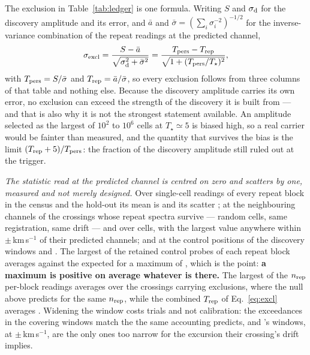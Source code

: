 The exclusion in Table~\ref{tab:ledger} is one formula. Writing $S$ and
$\sigma_{\rm d}$ for the discovery amplitude and its error, and $\bar{a}$ and
$\bar{\sigma}=(\sum_i\sigma_i^{-2})^{-1/2}$ for the inverse-variance
combination of the repeat readings at the predicted channel,
\begin{equation}
\sigma_{\rm excl}=\frac{S-\bar{a}}
{\sqrt{\sigma_{\rm d}^{2}+\bar{\sigma}^{2}}}
=\frac{T_{\rm pers}-T_{\rm rep}}{\sqrt{1+(T_{\rm pers}/T_\star)^{2}}},
\label{eq:excl}
\end{equation}
with $T_{\rm pers}=S/\bar{\sigma}$ and $T_{\rm rep}=\bar{a}/\bar{\sigma}$, so
every exclusion follows from three columns of that table and nothing else.
Because the discovery amplitude carries its own error, no exclusion can exceed
the strength of the discovery it is built from --- and that is also why it is
not the strongest statement available. An amplitude selected as the largest of
$10^{2}$ to $10^{6}$ cells at $T_\star\simeq5$ is biased high, so a real
carrier would be fainter than measured, and the quantity that survives the
bias is the limit $(T_{\rm rep}+5)/T_{\rm pers}$: the fraction of the
discovery amplitude still ruled out at the trigger.

\emph{The statistic read at the predicted channel is centred on zero and
scatters by one, measured and not merely designed.} Over \NuNullN{}
single-cell readings of every repeat block in the census and the hold-out its
mean is \NuNullMean{} and its scatter \NuNullSd; at the neighbouring channels
of the \WdBandNCross{} crossings whose repeat spectra survive --- random
cells, same registration, same drift --- \NuBandMean{} and \NuBandSd{} over
\NuBandN{} cells, with \WdBandMax{} the largest value anywhere within
$\pm$\WdBandKms\,km\,s$^{-1}$ of their predicted channels; and at the control
positions of the discovery windows \NuDiscCtrlMean{} and \NuDiscCtrlSd. The
largest of the \NuCtrlRet{} retained control probes of each repeat block
averages \NuCtrlMean{} against the \NuCtrlPred{} expected for a maximum of
\NuCtrlRet, which is the point: \textbf{a maximum is positive on average
whatever is there.} The largest of the $n_{\rm rep}$ per-block readings
averages \NuColMean{} over the crossings carrying exclusions, where the null
above predicts \NuColPred{} for the same $n_{\rm rep}$, while the combined
$T_{\rm rep}$ of Eq.~\ref{eq:excl} averages \NuRepMean. Widening the window
costs trials and not calibration: the \WdNExc{} exceedances in the \WdNCov{}
covering windows match the \WdExpect{} the same accounting predicts, and
\WdOrbShortStar's windows, at $\pm$\WdOrbShortKms\,km\,s$^{-1}$, are the only
ones too narrow for the excursion their crossing's drift implies.

